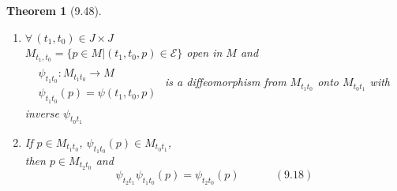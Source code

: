 \documentclass[11pt]{amsart}
\newtheorem{theorem}{Theorem}
\theoremstyle{definition}
\begin{document}
\begin{theorem}[9.48]
\begin{enumerate}
then $\begin{aligned}
  & \quad \\
  & \mathcal{E}^{(t_1,q)} = \mathcal{E}^{(t_0,p)} \text{ and } \\
  & \psi^{(t_1,q)} = \psi^{(t_0,p)} \end{aligned}$
\item[(c)] $\forall \, (t_1,t_0) \in J \times J $ \\
$M_{t_1,t_0} = \lbrace p \in M | (t_1,t_0, p) \in \mathcal{E} \rbrace$ open in $M$ and \\
  $\begin{aligned}
  & \quad \\
  & \psi_{t_1t_0} : M_{t_1t_0} \to M \\
  & \psi_{t_1t_0}(p) = \psi(t_1,t_0,p) \end{aligned}$
is a diffeomorphism from $M_{t_1t_0}$ onto $M_{t_0t_1}$ with inverse $\psi_{t_0t_1}$
\item[(d)] If $p \in M_{t_1t_0} $, $\psi_{t_1t_0}(p) \in M_{t_0t_1}$, \\
then $p\in M_{t_2 t_0}$ and
\begin{equation}
\psi_{t_2t_1} \psi_{t_1t_0}(p) = \psi_{t_2t_0}(p) \quad \quad \quad \, (9.18)
\end{equation}
\end{enumerate}

\end{theorem}
\end{document}
